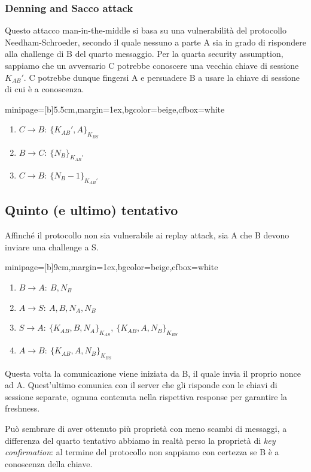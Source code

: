 \documentclass[a4paper, 11pt, notitlepage, fleqn]{report}
\newcommand{\fromto}[2]{#1\rightarrow #2\!:\ }
\newenvironment{colbox}[2]%
{%
	\par\noindent\hspace{10pt}
	\begin{adjustbox}{minipage=[b]{#2},margin=1ex,bgcolor=#1,cfbox=white}
}{%
	\end{adjustbox}\newline%
}
\begin{document}
\subsubsection{Denning and Sacco attack}
Questo attacco man-in-the-middle si basa su una vulnerabilità del protocollo Needham-Schroeder, secondo il quale nessuno a parte A sia in grado di rispondere alla challenge di B del quarto messaggio. Per la quarta security assumption, sappiamo che un avversario C potrebbe conoscere una vecchia chiave di sessione $K_{AB}'$. C potrebbe dunque fingersi A e persuadere B a usare la chiave di sessione di cui è a conoscenza.
\begin{colbox}{beige}{5.5cm}
	\begin{enumerate}
		\item[3.] $\fromto{C}{B}\{K_{AB}',A\}_{K_{BS}}$
		\item[4.] $\fromto{B}{C}\{N_B\}_{K_{AB}'}$
		\item[5.] $\fromto{C}{B}\{N_B-1\}_{K_{AB}'}$
	\end{enumerate}
\end{colbox}

\subsection{Quinto (e ultimo) tentativo}
Affinché il protocollo non sia vulnerabile ai replay attack, sia A che B devono inviare una challenge a S.
\begin{colbox}{beige}{9cm}
	\begin{enumerate}
		\item $\fromto{B}{A}B,N_B$
		\item $\fromto{A}{S}A,B,N_A,N_B$
		\item $\fromto{S}{A}\{K_{AB},B,N_A\}_{K_{AS}},\ \{K_{AB},A,N_B\}_{K_{BS}}$
		\item $\fromto{A}{B}\{K_{AB},A,N_B\}_{K_{BS}}$
	\end{enumerate}
\end{colbox}
Questa volta la comunicazione viene iniziata da B, il quale invia il proprio nonce ad A. Quest'ultimo comunica con il server che gli risponde con le chiavi di sessione separate, ognuna contenuta nella rispettiva response per garantire la freshness.

Può sembrare di aver ottenuto più proprietà con meno scambi di messaggi, a differenza del quarto tentativo abbiamo in realtà perso la proprietà di \emph{key confirmation}: al termine del protocollo non sappiamo con certezza se B è a conoscenza della chiave.
\end{document}
